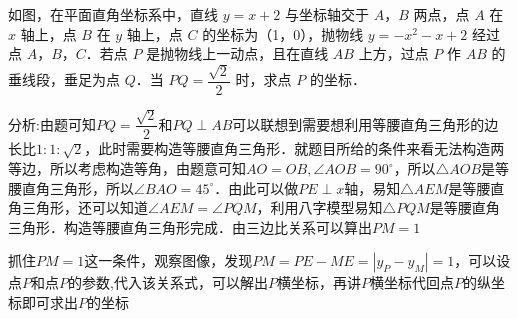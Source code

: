 \begin{minipage}{1\linewidth}
\begin{figure}
\begin{center}
    \end{center}
    
    \end{figure}

    \begin{example}
        
        如图，在平面直角坐标系中，直线 \( y = x + 2 \) 与坐标轴交于 \( A \)，\( B \) 两点，点 \( A \) 在 \( x \) 轴上，点 \( B \) 在 \( y \) 轴上，点 \( C \) 的坐标为（1，0），抛物线 \( y = -x^2-x + 2 \) 经过点 \( A \)，\( B \)，\( C \)．若点 \( P \) 是抛物线上一动点，且在直线 \( AB \) 上方，过点 \( P \) 作 \( AB \) 的垂线段，垂足为点 \( Q \)．当 \( PQ = \dfrac{\sqrt{2}}{2} \) 时，求点 \( P \) 的坐标．
        
    \end{example}

    \begin{solution}
    分析:由题可知\(PQ=\dfrac{\sqrt{2}}{2}\)和\(PQ\perp AB\)可以联想到需要想利用等腰直角三角形的边长比\(1:1:\sqrt{2}\)，此时需要构造等腰直角三角形．就题目所给的条件来看无法构造两等边，所以考虑构造等角，由题意可知\(AO=OB,\angle AOB=90^\circ\)，所以\(\triangle AOB\)是等腰直角三角形，所以\(\angle BAO=45^\circ\)．由此可以做\(PE\perp x\)轴，易知\(\triangle AEM\)是等腰直角三角形，还可以知道\(\angle AEM=\angle PQM\)，利用八字模型易知\(\triangle PQM\)是等腰直角三角形．构造等腰直角三角形完成．由三边比关系可以算出\(PM=1\)
    \par
    抓住\(PM=1\)这一条件，观察图像，发现\(PM=PE-ME=|y_P-y_M|=1\)，可以设点\(P\)和点\(P\)的参数,代入该关系式，可以解出\(P\)横坐标，再讲\(P\)横坐标代回点\(P\)的纵坐标即可求出\(P\)的坐标
    \end{solution}

\end{minipage}

